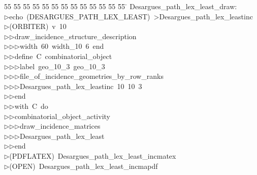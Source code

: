 %
%
\begin{tabbing}
55 \= 55 \= 55 \= 55 \= 55 \= 55 \= 55 \= 55 \= 55 \= 55 \= 55 \= 55 \= 55 \= \kill
Desargues\_path\_lex\_least\_draw:\\[0pt]
$\triangleright$\>echo\ (DESARGUES\_PATH\_LEX\_LEAST)\ {\textgreater}Desargues\_path\_lex\_leastinc\\[0pt]
$\triangleright$\>(ORBITER)\ v\ 10\ \\[0pt]
$\triangleright$\>$\triangleright$\>draw\_incidence\_structure\_description\ \\[0pt]
$\triangleright$\>$\triangleright$\>$\triangleright$\>width\ 60\ width\_10\ 6\ end\ \\[0pt]
$\triangleright$\>$\triangleright$\>define\ C\ combinatorial\_object\ \\[0pt]
$\triangleright$\>$\triangleright$\>$\triangleright$\>label\ geo\_10\_3\ geo\_10\_3\ \\[0pt]
$\triangleright$\>$\triangleright$\>$\triangleright$\>file\_of\_incidence\_geometries\_by\_row\_ranks\ \\[0pt]
$\triangleright$\>$\triangleright$\>$\triangleright$\>Desargues\_path\_lex\_leastinc\ 10\ 10\ 3\ \\[0pt]
$\triangleright$\>$\triangleright$\>end\ \\[0pt]
$\triangleright$\>$\triangleright$\>with\ C\ do\ \\[0pt]
$\triangleright$\>$\triangleright$\>combinatorial\_object\_activity\ \\[0pt]
$\triangleright$\>$\triangleright$\>$\triangleright$\>draw\_incidence\_matrices\ \\[0pt]
$\triangleright$\>$\triangleright$\>$\triangleright$\>Desargues\_path\_lex\_least\ \\[0pt]
$\triangleright$\>$\triangleright$\>end\\[0pt]
$\triangleright$\>(PDFLATEX)\ Desargues\_path\_lex\_least\_incmatex\\[0pt]
$\triangleright$\>(OPEN)\ Desargues\_path\_lex\_least\_incmapdf\\[0pt]
\end{tabbing}
